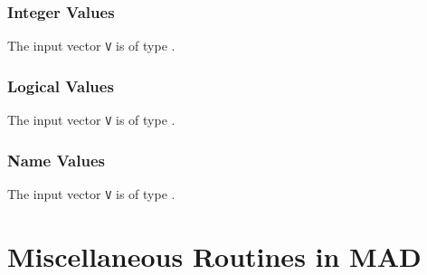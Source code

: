 \subsection{Integer Values}
\label{UTPINT}
The input vector {\tt V} is of type .

\subsection{Logical Values}
\label{UTPLOG}
The input vector {\tt V} is of type .

\subsection{Name Values}
\label{UTPNAM}
The input vector {\tt V} is of type .


\chapter{Miscellaneous Routines in MAD}
\label{C-misc}

